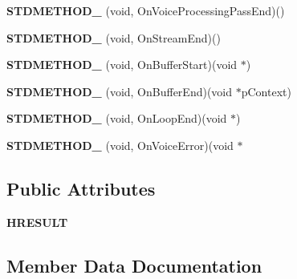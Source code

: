 \begin{DoxyCompactItemize}
\mbox{\label{structStreamingVoiceContext_a9b94bfe00fc901fbe5a3c828c33ef42d}} 
{\bfseries S\+T\+D\+M\+E\+T\+H\+O\+D\+\_\+} (void, On\+Voice\+Processing\+Pass\+End)()
\item 
\mbox{\label{structStreamingVoiceContext_a5f23ec1e8cd3d63285a90c4f572c1882}} 
{\bfseries S\+T\+D\+M\+E\+T\+H\+O\+D\+\_\+} (void, On\+Stream\+End)()
\item 
\mbox{\label{structStreamingVoiceContext_ae80b03490f9f7f88a9e4a708a5abb9f3}} 
{\bfseries S\+T\+D\+M\+E\+T\+H\+O\+D\+\_\+} (void, On\+Buffer\+Start)(void $\ast$)
\item 
\mbox{\label{structStreamingVoiceContext_a25babd4be50837b73e1c39d9bd06c2f3}} 
{\bfseries S\+T\+D\+M\+E\+T\+H\+O\+D\+\_\+} (void, On\+Buffer\+End)(void $\ast$p\+Context)
\item 
\mbox{\label{structStreamingVoiceContext_a3f49c526b8dd5f37100fd0ae91b46aac}} 
{\bfseries S\+T\+D\+M\+E\+T\+H\+O\+D\+\_\+} (void, On\+Loop\+End)(void $\ast$)
\item 
\mbox{\label{structStreamingVoiceContext_a89a0700ff14cc9c6349f9416f27ff013}} 
{\bfseries S\+T\+D\+M\+E\+T\+H\+O\+D\+\_\+} (void, On\+Voice\+Error)(void $\ast$
\end{DoxyCompactItemize}
\subsection*{Public Attributes}
\begin{DoxyCompactItemize}
\item 
{\bfseries H\+R\+E\+S\+U\+LT}
\end{DoxyCompactItemize}


\subsection{Member Data Documentation}
\mbox{\label{structStreamingVoiceContext_a4ce71d6a9d05256102234dc27c90b6db}} 

